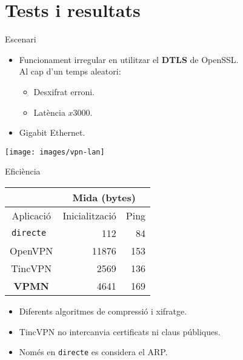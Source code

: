 \section{Tests i resultats}
    \begin{frame}{Escenari}
        \begin{itemize}
\item Funcionament irregular en utilitzar el \textbf{DTLS} de OpenSSL.\\
Al cap d'un temps aleatori:
	        \begin{itemize}
\item Desxifrat erroni.
\item Latència $x3000$.
	        \end{itemize}
        \end{itemize}
        \begin{itemize}
\item Gigabit Ethernet.
        \end{itemize}
        \vspace{2em}
        \begin{center}
        \texttt{[image: images/vpn-lan]}
        \end{center}
    \end{frame}
    \begin{frame}{Eficiència}
        \begin{center}
\begin{tabular}{|c|r|r|}
\multicolumn{1}{c}{} & \multicolumn{2}{|c|}{Mida (bytes)} \\ \hline
Aplicació & Inicialització & Ping \\ \hline \hline
\tt directe & 112 & 84 \\ \hline
OpenVPN & 11876 & 153 \\ \hline
TincVPN & 2569 & 136 \\ \hline
\bf VPMN & 4641 & 169 \\ \hline
\end{tabular}
        \end{center}
        \begin{itemize}
\item Diferents algoritmes de compressió i xifratge.
\item TincVPN no intercanvia certificats ni claus públiques.
\item Només en {\tt directe} es considera el ARP.
        \end{itemize}
    \end{frame}
